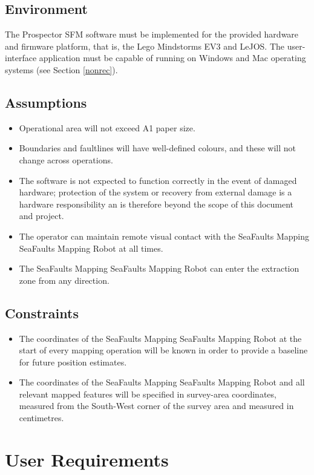 \documentclass[12pt]{article}
\begin{document}
\subsection{Environment}

The Prospector SFM software must be implemented for the provided hardware
and firmware platform, that is, the Lego Mindstorms EV3 and LeJOS.
The user-interface application must be capable of running on Windows and Mac operating systems (see Section \ref{nonrec}).

\subsection{Assumptions}\label{Assumptions}
\begin{itemize}{}
\item Operational area will not exceed A1 paper size. 
\item Boundaries and faultlines will have well-defined colours, and
these will not change across operations.
\item The software is not expected to function correctly in the event
of damaged hardware; protection of the system or recovery from external
damage is a hardware responsibility an is therefore beyond the scope
of this document and project.
\item The operator can maintain remote visual contact with the SeaFaults Mapping SeaFaults Mapping Robot at all times.
\item The SeaFaults Mapping SeaFaults Mapping Robot can enter the extraction zone from any direction.
\end{itemize}

\subsection{Constraints}\label{Constraints}
\begin{itemize}{}
\item The coordinates of the SeaFaults Mapping SeaFaults Mapping Robot at the start of every mapping operation will be known in order to provide a baseline for future position estimates.
\item The coordinates of the SeaFaults Mapping SeaFaults Mapping Robot and all relevant mapped features will be specified in survey-area coordinates, measured from the South-West corner of the survey area and measured in centimetres. 
\end{itemize}

\section{User Requirements}\label{userrec}
\end{document}
